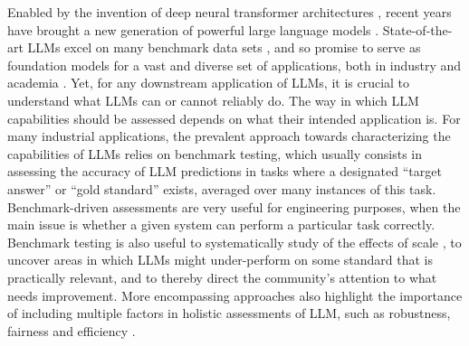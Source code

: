 \documentclass[fleqn]{article}
\begin{document}
Enabled by the invention of deep neural transformer architectures \citep{VaswaniShazeer2017:Attention-is-Al}, recent years have brought a new generation of powerful large language models  \citep{DevlinChang2019:BERT:-Pre-train,ChungHou2022:Scaling-Instruc,OpenAI2023:GPT-4-Technical,TouvronLavril2023:LLaMA:-Open-and}.
State-of-the-art LLMs excel on many benchmark data sets \citep[e.g.,][]{srivastava2023-BIGbench,PerezRinger2023:Discovering-Lan}, and so promise to serve as foundation models for a vast and diverse set of applications, both in industry and academia \citep{BommasaniHudson2021:On-the-opportun}.
Yet, for any downstream application of LLMs, it is crucial to understand what LLMs can or cannot reliably do.
The way in which LLM capabilities should be assessed depends on what their intended application is.
For many industrial applications, the prevalent approach towards characterizing the capabilities of LLMs relies on benchmark testing, which usually consists in assessing the accuracy of LLM predictions in tasks where a designated ``target answer'' or ``gold standard'' exists, averaged over many instances of this task.
Benchmark-driven assessments are very useful for engineering purposes, when the main issue is whether a given system can perform a particular task correctly.
Benchmark testing is also useful to systematically study of the effects of scale \citep[e.g.,][]{srivastava2023-BIGbench}, to uncover areas in which LLMs might under-perform on some standard that is practically relevant, and to thereby direct the community's attention to what needs improvement.
More encompassing approaches also highlight the importance of including multiple factors in holistic assessments of LLM, such as robustness, fairness and efficiency \citep{LiangBommasani2023:Holistic-Evalua}.

\end{document}
